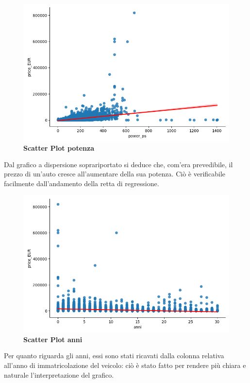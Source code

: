 \begin{figure}[H]
    \centering
    \includegraphics[scale=0.45]{Immagini/potenza}
    \caption{\textbf{Scatter Plot potenza}}
    \label{fig:power_ps}
\end{figure}
Dal grafico a dispersione soprariportato si deduce che, com'era prevedibile, il prezzo di un'auto cresce all'aumentare della sua potenza. Ciò è verificabile facilmente dall'andamento della retta di regressione.
\begin{figure}[H]
    \centering
    \includegraphics[scale=0.45]{Immagini/anni}
    \caption{\textbf{Scatter Plot anni}}
    \label{fig:anni}
\end{figure}
\pagebreak
Per quanto riguarda gli anni, essi sono stati ricavati dalla colonna relativa all'anno di immatricolazione del veicolo: ciò è stato fatto per rendere più chiara e naturale l'interpretazione del grafico.

